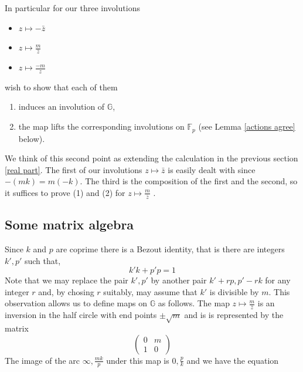 \documentclass[12pt,a4paper]{amsart}
\def\GG{\mathbb{G}}
\def\fp{\mathbb{F}_p}
\begin{document}




In particular 
for our  
three involutions
\begin{itemize}
	\item $z\mapsto - \bar{z}$ 
	\item $z\mapsto \frac{m}{\bar{z}}$ 
	\item $z\mapsto \frac{-m}{z}$ 
\end{itemize}
wish to show that each of them
\begin{enumerate}

	\item induces an involution of $\GG$,
	\item the map lifts the corresponding
	involutions on $\fp$ (see Lemma \ref{actions agree}
	below).

\end{enumerate}
We think of this second point as extending the calculation in the previous section
\ref{real part}.
The first of our involutions $z\mapsto\bar{z}$ 
is easily dealt with since $-(mk) = m(-k)$.
The third is the composition of the first and the second,
so it suffices to prove (1) and (2) for $z\mapsto \frac{m}{\bar{z}}$
.

\subsection{Some matrix algebra}

Since $k$ and $p$ are coprime there is a Bezout identity,
that is there are integers $k',p'$ such that,
$$k'k + p'p = 1$$
Note that we may replace the pair $k',p'$
by another pair $k'+ rp, p' -rk$ for any integer $r$
and, by chosing $r$ suitably,
may assume that $k'$ is divisible by $m$.
This observation allows us to define maps on $\GG$ as follows.
The map 
$z\mapsto \frac{m}{\bar{z}}$ is an inversion in the half circle
with end points $\pm\sqrt{m}$  and is 
is represented by the matrix
$$
\begin{pmatrix}
	0 & m \\ 1 & 0
\end{pmatrix}
$$
The image of the arc $\infty,\frac{mk}{p}$
under this map is $0, \frac{p}{k}$
and we have the equation
\end{document}
